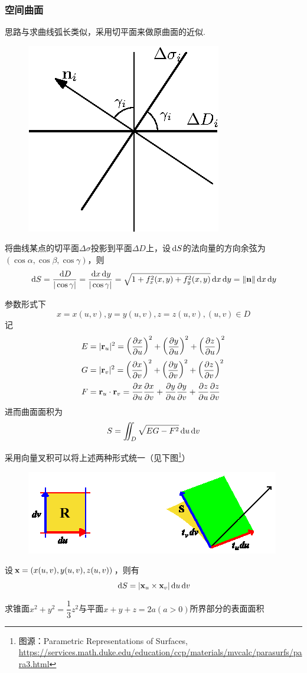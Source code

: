 \subsubsection{空间曲面}
\label{subsubsec:surface_area}
思路与求曲线弧长类似，采用切平面来做原曲面的近似.
\begin{figure}[H]
\centering
\includegraphics[width=0.2\linewidth]{fig/surface_projection.eps}
\end{figure}
\par 将曲线某点的切平面$\Delta\sigma$投影到平面$\Delta D$上，设$\,\mathrm{d} S$的法向量的方向余弦为$(\cos\alpha,\cos\beta,\cos\gamma)$，则
\[\,\mathrm{d} S=\frac{\,\mathrm{d} D}{|\cos\gamma|}=\frac{\,\mathrm{d} x\,\mathrm{d} y}{|\cos\gamma|}=\sqrt{1+f^2_x(x,y)+f^2_y(x,y)}\,\mathrm{d} x\,\mathrm{d} y=\|\mathbf{n}\|\,\mathrm{d} x\,\mathrm{d} y\]
\par 参数形式下
\[x=x(u,v),y=y(u,v),z=z(u,v),(u,v)\in D\]
记
\[\begin{aligned}
E&=|\mathbf{r}_u|^2=\left(\dfrac{\partial x}{\partial u}\right)^2+\left(\dfrac{\partial y}{\partial u}\right)^2+\left(\dfrac{\partial z}{\partial u}\right)^2\\
G&=|\mathbf{r}_v|^2=\left(\dfrac{\partial x}{\partial v}\right)^2+\left(\dfrac{\partial y}{\partial v}\right)^2+\left(\dfrac{\partial z}{\partial v}\right)^2\\
F&=\mathbf{r}_u\cdot\mathbf{r}_v=\dfrac{\partial x}{\partial u}\dfrac{\partial x}{\partial v}+\dfrac{\partial y}{\partial u}\dfrac{\partial y}{\partial v}+\dfrac{\partial z}{\partial u}\dfrac{\partial z}{\partial v}
\end{aligned}\]
进而曲面面积为
\[S=\iint_D\sqrt{EG-F^2}\,\mathrm{d} u\,\mathrm{d} v\]
\par 采用向量叉积可以将上述两种形式统一（见下图\footnote{图源：Parametric Representations of Surfaces, \url{https://services.math.duke.edu/education/ccp/materials/mvcalc/parasurfs/para3.html}}）
\begin{figure}[H]
\centering
\includegraphics[width=0.4\linewidth]{fig/coordinate_projection2.png}
\end{figure}
设$\mathbf{x}=(x(u,v),y(u,v),z(u,v))$，则有
\[\,\mathrm{d} S=|\mathbf{x}_u\times\mathbf{x}_v|\,\mathrm{d} u\,\mathrm{d} v\]
\begin{example}
求锥面$x^2+y^2=\dfrac{1}{3}z^2$与平面$x+y+z=2a(a>0)$所界部分的表面面积
\end{example}
